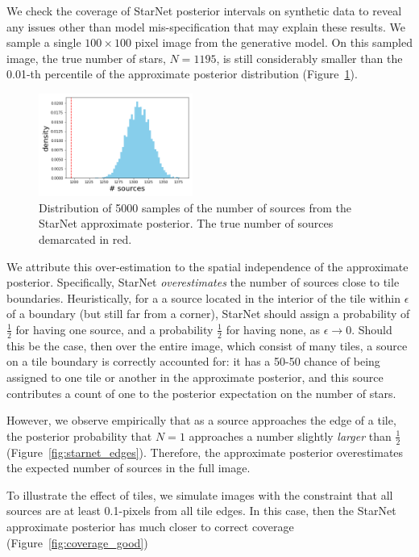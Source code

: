 We check the coverage of StarNet posterior intervals on synthetic data
to reveal any issues other than model mis-specification that may explain these results.
We sample a single $100\times100$ pixel image from the generative model. 
On this sampled image, the true number of stars, $N = 1195$,
is still considerably smaller than the 0.01-th percentile of
the approximate posterior distribution (Figure~\ref{fig:starnet_density}).


\begin{figure}[tb]
    \centering
    \includegraphics[width=0.45\textwidth]{./figures/coverage/starnet_histogram.png}
    \caption{Distribution of 5000 samples of the number of sources from the StarNet approximate posterior.
    The true number of sources demarcated in red. }
    \label{fig:starnet_density}
\end{figure}

We attribute this over-estimation to the spatial independence of the approximate posterior.
Specifically, StarNet \textit{overestimates} the number of sources close to tile boundaries.
Heuristically, for a
a source located in the interior of the tile
within $\epsilon$ of a boundary (but still far from a corner),
StarNet should assign a probability of $\frac{1}{2}$ for
having one source, and a probability $\frac{1}{2}$ for having none, as $\epsilon \rightarrow 0$.
Should this be the case, then over the entire image, which consist of many tiles,
a source on a tile boundary is correctly accounted for: it has a 50-50 chance of being assigned to one tile or another
in the approximate posterior, and this source contributes 
a count of one to the posterior expectation on the number of stars. 

However, we observe empirically that as a source approaches the edge of a tile,
the posterior probability that $N = 1$ approaches a number
slightly \textit{larger} than $\frac{1}{2}$ (Figure~\ref{fig:starnet_edges}).
Therefore, the approximate posterior overestimates the expected number of sources in the full image.

To illustrate the effect of tiles, we simulate images with the constraint that all sources are at least 0.1-pixels from all tile edges. 
In this case, then the StarNet approximate posterior has much closer to correct coverage (Figure~\ref{fig:coverage_good})

